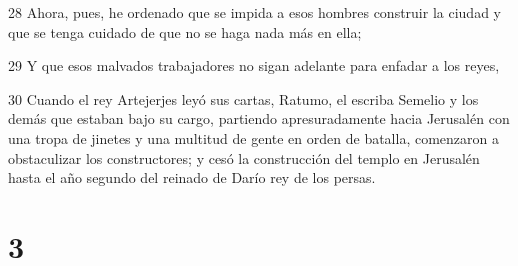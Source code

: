 \par 28 Ahora, pues, he ordenado que se impida a esos hombres construir la ciudad y que se tenga cuidado de que no se haga nada más en ella;
\par 29 Y que esos malvados trabajadores no sigan adelante para enfadar a los reyes,
\par 30 Cuando el rey Artejerjes leyó sus cartas, Ratumo, el escriba Semelio y los demás que estaban bajo su cargo, partiendo apresuradamente hacia Jerusalén con una tropa de jinetes y una multitud de gente en orden de batalla, comenzaron a obstaculizar los constructores; y cesó la construcción del templo en Jerusalén hasta el año segundo del reinado de Darío rey de los persas.

\chapter{3}


